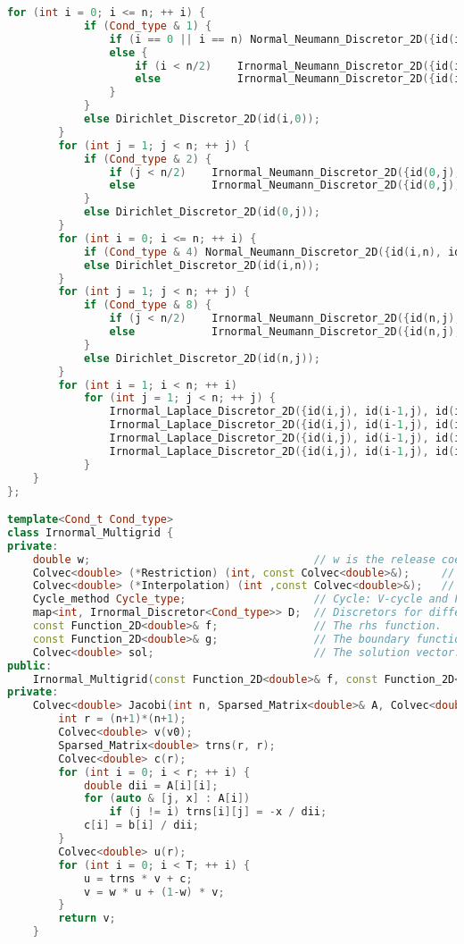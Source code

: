 \documentclass{ctexart}
\begin{document}
\begin{lstlisting}[language=c++]
		for (int i = 0; i <= n; ++ i) {
			if (Cond_type & 1) {
				if (i == 0 || i == n) Normal_Neumann_Discretor_2D({id(i,0), id(i,1), id(i,2)});
				else {
					if (i < n/2)	Irnormal_Neumann_Discretor_2D({id(i,0), id(i+1,0), id(i+2,0), id(i,1), id(i+1,1), id(i,2)});
					else			Irnormal_Neumann_Discretor_2D({id(i,0), id(i-1,0), id(i-2,0), id(i,1), id(i-1,1), id(i,2)});
				}
			}
			else Dirichlet_Discretor_2D(id(i,0));
		}
		for (int j = 1; j < n; ++ j) {
			if (Cond_type & 2) {
				if (j < n/2)	Irnormal_Neumann_Discretor_2D({id(0,j), id(1,j), id(2,j), id(0,j+1), id(1,j+1), id(0,j+2)});
				else			Irnormal_Neumann_Discretor_2D({id(0,j), id(1,j), id(2,j), id(0,j-1), id(1,j-1), id(0,j-2)});
			}
			else Dirichlet_Discretor_2D(id(0,j));
		}
		for (int i = 0; i <= n; ++ i) {
			if (Cond_type & 4) Normal_Neumann_Discretor_2D({id(i,n), id(i,n-1), id(i,n-2)});
			else Dirichlet_Discretor_2D(id(i,n));
		}
		for (int j = 1; j < n; ++ j) {
			if (Cond_type & 8) {
				if (j < n/2)	Irnormal_Neumann_Discretor_2D({id(n,j), id(n-1,j), id(n-2,j), id(n,j+1), id(n-1,j+1), id(n,j+2)});
				else			Irnormal_Neumann_Discretor_2D({id(n,j), id(n-1,j), id(n-2,j), id(n,j-1), id(n-1,j-1), id(n,j-2)});
			}
			else Dirichlet_Discretor_2D(id(n,j));
		}
		for (int i = 1; i < n; ++ i)
			for (int j = 1; j < n; ++ j) {
				Irnormal_Laplace_Discretor_2D({id(i,j), id(i-1,j), id(i+1,j), id(i,j-1), id(i,j+1), id(i-1,j-1)});
				Irnormal_Laplace_Discretor_2D({id(i,j), id(i-1,j), id(i+1,j), id(i,j-1), id(i,j+1), id(i-1,j+1)});
				Irnormal_Laplace_Discretor_2D({id(i,j), id(i-1,j), id(i+1,j), id(i,j-1), id(i,j+1), id(i+1,j-1)});
				Irnormal_Laplace_Discretor_2D({id(i,j), id(i-1,j), id(i+1,j), id(i,j-1), id(i,j+1), id(i+1,j+1)});
			}
	}
};

template<Cond_t Cond_type>
class Irnormal_Multigrid {
private:
	double w;									// w is the release coefficient.
	Colvec<double> (*Restriction) (int, const Colvec<double>&);		// Restriction: Full Weighting and Injection.
	Colvec<double> (*Interpolation) (int ,const Colvec<double>&);	// Interpolation: Linear and Quadratic.
	Cycle_method Cycle_type;					// Cycle: V-cycle and FMG.
	map<int, Irnormal_Discretor<Cond_type>> D;	// Discretors for different grids.
	const Function_2D<double>& f;				// The rhs function.
	const Function_2D<double>& g;				// The boundary function.
	Colvec<double> sol;							// The solution vector.
public:
	Irnormal_Multigrid(const Function_2D<double>& f, const Function_2D<double>& g): w(2.0/3), f(f), g(g) {}
private:
	Colvec<double> Jacobi(int n, Sparsed_Matrix<double>& A, Colvec<double>& b, const Colvec<double>& v0, int T) {
		int r = (n+1)*(n+1);
		Colvec<double> v(v0);
		Sparsed_Matrix<double> trns(r, r);
		Colvec<double> c(r);
		for (int i = 0; i < r; ++ i) {
			double dii = A[i][i];
			for (auto & [j, x] : A[i])
				if (j != i) trns[i][j] = -x / dii;
			c[i] = b[i] / dii;
		}
		Colvec<double> u(r);
		for (int i = 0; i < T; ++ i) {
			u = trns * v + c;
			v = w * u + (1-w) * v;
		}
		return v;
	}


\end{lstlisting}
\end{document}
